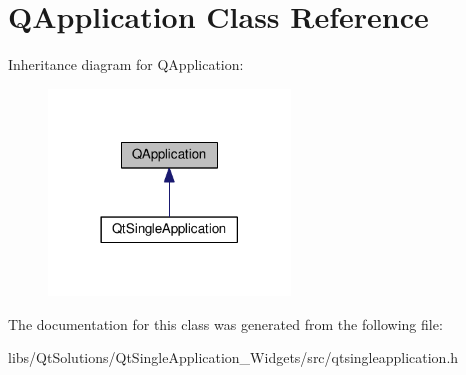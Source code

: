 \hypertarget{class_q_application}{}\section{Q\+Application Class Reference}
\label{class_q_application}


Inheritance diagram for Q\+Application\+:\nopagebreak
\begin{figure}[H]
\begin{center}
\leavevmode
\includegraphics[width=182pt]{class_q_application__inherit__graph}
\end{center}
\end{figure}


The documentation for this class was generated from the following file\+:\begin{DoxyCompactItemize}
\item 
libs/\+Qt\+Solutions/\+Qt\+Single\+Application\+\_\+\+Widgets/src/qtsingleapplication.\+h\end{DoxyCompactItemize}
